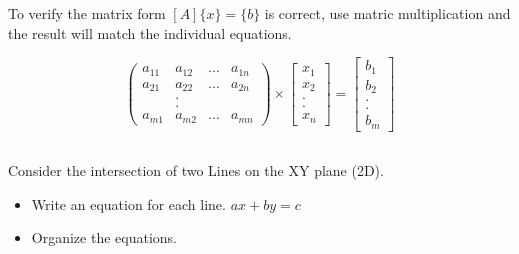 \documentclass[fleqn]{beamer} %
\newcommand{\sectionIsubsectionIItitle}{}
\newcommand{\sectionIsubsectionIIItitle}{}
\begin{document}
			\begin{frame}
				\frametitle{\sectionIsubsectionIItitle} \small
				\bigskip

				To verify the matrix form $[A]\{x\}=\{b\}$ is correct, use matric multiplication and the result will match the individual equations.	

				\begin{fleqn}

					\[ \left( \begin{array}{cccc}
					a_{11} & a_{12} & ...& a_{1n} \\
					a_{21} & a_{22} & ...& a_{2n} \\
					&.&&\\
					&.&&\\
					a_{m1} & a_{m2} & ...& a_{mn}\end{array} \right) \times \left[ \begin{array}{c}
					x_1 \\
					x_2 \\
					.\\
					.\\
					x_n \end{array} \right] = \left[ \begin{array}{c}
					b_1 \\
					b_2 \\
					.\\
					.\\
					b_m \end{array} \right]\] 

				\end{fleqn}


				\btVFill
			\end{frame}

		\subsection{\sectionIsubsectionIIItitle}\label{sectionIsubsectionIII}
			\begin{frame} 
				\frametitle{\sectionIsubsectionIIItitle}
				\bigskip

				 Consider the intersection of two Lines on the XY plane (2D).  \hspace{5mm} 

					\begin{itemize}
	
						\item Write an equation for each line.  $ax+by=c$ \vspace{3mm} \\
	
						\item Organize the equations. \vspace{3mm} \\
					
					\end{itemize}

				\btVFill
			\end{frame}	
\end{document}
